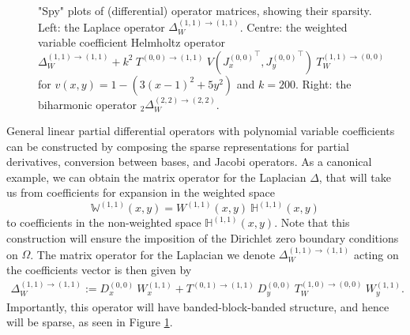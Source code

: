 \documentclass[11pt, oneside]{article}   	%
\newcommand{\hdop}{H}
\newcommand{\Wii}{W^{(1,1)}}
\newcommand{\bighdopii}{{\mathbb{\hdop}^{(1,1)}}}
\newcommand{\laplacewii}{\Delta_W^{(1,1)\to(1,1)}}
\newcommand{\biharmonic}{_2\Delta_W^{(2,2)\to(2,2)}}
\newcommand{\bigWii}{{\mathbb{W}^{(1,1)}}}
\begin{document}
\begin{figure}[t]
\begin{subfigure}{0.32\textwidth}
	\end{subfigure}
    	\caption{"Spy" plots of (differential) operator matrices, showing their sparsity. Left: the Laplace operator $\laplacewii$. Centre: the weighted variable coefficient Helmholtz operator $\laplacewii + k^2 \: T^{(0,0)\to(1,1)} \: V({J_x^{(0,0)}}^\top, {J_y^{(0,0)}}^\top) \: T_W^{(1,1)\to(0,0)}$ for $v(x,y) = 1 - (3(x-1)^2 + 5y^2)$ and $k = 200$. Right: the biharmonic operator $\biharmonic$.}
        \label{fig:sparsity}
        \centering
\end{figure}

General linear partial differential operators with polynomial variable coefficients can be constructed by composing the sparse representations for partial derivatives, conversion between bases, and Jacobi operators. As a canonical example, we can obtain the matrix operator for the Laplacian \(\Delta\), that will take us from coefficients for expansion in the weighted space
$$
\bigWii(x,y) = \Wii(x,y) \: \bighdopii(x,y)
$$
to coefficients in the non-weighted space $\bighdopii(x,y)$. Note that this construction will ensure the imposition of the Dirichlet zero boundary conditions on $\Omega$. The matrix operator for the Laplacian we denote $\laplacewii$ acting on the coefficients vector is then given by
\begin{align*}
    \laplacewii := D_x^{(0,0)} \: W_x^{(1,1)} + T^{(0,1)\to(1,1)} \: D_y^{(0,0)} \: T_W^{(1,0)\to(0,0)} \: W_y^{(1,1)}.
\end{align*}
Importantly, this operator will have banded-block-banded structure, and hence will be sparse, as seen in Figure \ref{fig:sparsity}.
\end{document}
